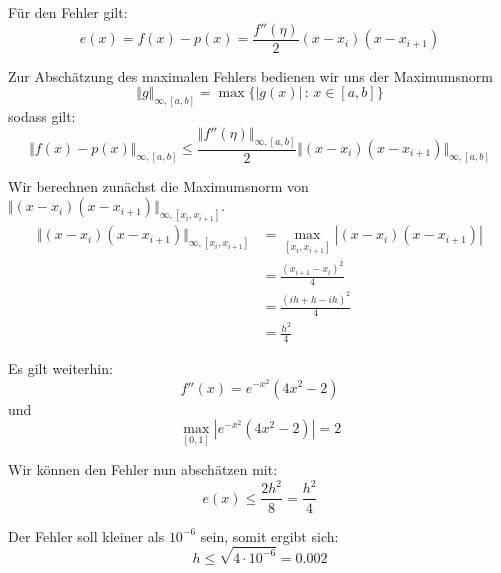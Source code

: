 \documentclass[11pt]{article}
\theoremstyle{plain}
\theoremstyle{definition}
\renewcommand{\a}{\"{a}}
\renewcommand{\o}{\"{o}}
\renewcommand{\u}{\"{u}}
\begin{document}
F\u r den Fehler gilt:
\begin{equation}
e(x) = f(x)-p(x) = \frac{f''(\eta)}{2}(x-x_i)(x-x_{i+1})
\end{equation}

Zur Absch\a tzung des maximalen Fehlers bedienen wir uns der Maximumsnorm
\begin{equation}
\Vert g \Vert_{\infty, [a,b]} = \max\{|g(x)| \, : \, x\in [a,b]\}
\end{equation}
sodass gilt:
\begin{equation}
\Vert f(x)-p(x)\Vert_{\infty, [a,b]} \leq \frac{\Vert f''(\eta) \Vert_{\infty, [a,b]}}{2}\Vert(x-x_i)(x-x_{i+1})\Vert_{\infty, [a,b]}
\end{equation}

Wir berechnen zun\a chst die Maximumsnorm von $\Vert(x-x_i)(x-x_{i+1})\Vert_{\infty, [x_i,x_{i+1}]}$.
\begin{align}
\Vert(x-x_i)(x-x_{i+1})\Vert_{\infty, [x_i,x_{i+1}]} &= \max_{[x_i,x_{i+1}]} |(x-x_i)(x-x_{i+1})| \\
&= \frac{(x_{i+1}-x_i)^2}{4}\\
&= \frac{(ih+h-ih)^2}{4} \\ 
&= \frac{h^2}{4}
\end{align}

Es gilt weiterhin:
\begin{equation}
f''(x) = e^{-x^2}(4x^2-2)
\end{equation}
und
\begin{equation}
\max_{[0,1]} |e^{-x^2}(4x^2-2)| = 2
\end{equation}

Wir k\o nnen den Fehler nun absch\a tzen mit:
\begin{equation}
e(x) \leq \frac{2h^2}{8} = \frac{h^2}{4}
\end{equation}

Der Fehler soll kleiner als $10^{-6}$ sein, somit ergibt sich:
\begin{equation}
h \leq \sqrt{4\cdot 10^{-6}} = 0.002
\end{equation}
\end{document}
